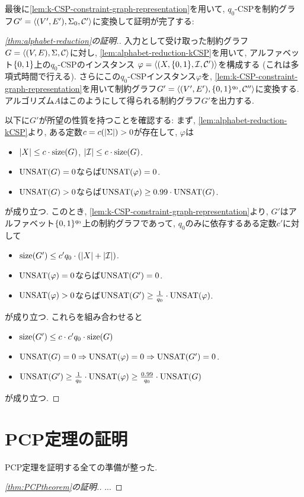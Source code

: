最後に\cref{lem:k-CSP-constraint-graph-representation}を用いて, $q_0$-CSPを制約グラフ$G'=\langle(V',E'),\Sigma_0,\mathcal{C}'\rangle$に変換して証明が完了する:
\begin{proof}[\cref{thm:alphabet-reduction}の証明.]
  入力として受け取った制約グラフ$G=\langle(V,E),\Sigma,\mathcal{C}\rangle$に対し, \cref{lem:alphabet-reduction-kCSP}を用いて, アルファベット$\{0,1\}$上の$q_0$-CSPのインスタンス $\varphi=\langle(X,\{0,1\},\mathcal{I},\mathcal{C}')\rangle$を構成する (これは多項式時間で行える).
  さらにこの$q_0$-CSPインスタンス$\varphi$を, \cref{lem:k-CSP-constraint-graph-representation}を用いて制約グラフ$G'=\langle(V',E'),\{0,1\}^{q_0},\mathcal{C}''\rangle$に変換する.
  アルゴリズム$A$はこのようにして得られる制約グラフ$G'$を出力する.

  以下に$G'$が所望の性質を持つことを確認する:
  まず, \cref{lem:alphabet-reduction-kCSP}より, ある定数$c=c(\abs{\Sigma})>0$が存在して, $\varphi$は
  \begin{itemize}
    \item $\abs{X} \le c\cdot\mathrm{size}(G)$, $\abs{\mathcal{I}} \le c\cdot\mathrm{size}(G)$.
    \item $\mathrm{UNSAT}(G)=0$ならば$\mathrm{UNSAT}(\varphi)=0$.
    \item $\mathrm{UNSAT}(G)>0$ならば$\mathrm{UNSAT}(\varphi) \ge 0.99\cdot\mathrm{UNSAT}(G)$.
  \end{itemize}
  が成り立つ.
  このとき, \cref{lem:k-CSP-constraint-graph-representation}より, $G'$はアルファベット$\{0,1\}^{q_0}$上の制約グラフであって, $q_0$のみに依存するある定数$c'$に対して
  \begin{itemize}
    \item $\mathrm{size}(G') \le c'q_0\cdot (\abs{X} + \abs{\mathcal{I}})$.
    \item $\mathrm{UNSAT}(\varphi)=0$ならば$\mathrm{UNSAT}(G')=0$.
    \item $\mathrm{UNSAT}(\varphi)>0$ならば$\mathrm{UNSAT}(G') \ge \frac{1}{q_0}\cdot\mathrm{UNSAT}(\varphi)$.
  \end{itemize}
  が成り立つ.
  これらを組み合わせると
  \begin{itemize}
    \item $\mathrm{size}(G') \le c\cdot c'q_0\cdot\mathrm{size}(G)$
    \item $\mathrm{UNSAT}(G)=0 \Rightarrow \mathrm{UNSAT}(\varphi)=0\Rightarrow \mathrm{UNSAT}(G')=0$.
    \item $\mathrm{UNSAT}(G') \ge \frac{1}{q_0}\cdot \mathrm{UNSAT}(\varphi) \ge \frac{0.99}{q_0}\cdot \mathrm{UNSAT}(G)$
  \end{itemize}
  が成り立つ.
\end{proof}

\section{PCP定理の証明}
PCP定理を証明する全ての準備が整った.
\begin{proof}[\cref{thm:PCPtheorem}の証明.]
  ...
\end{proof}